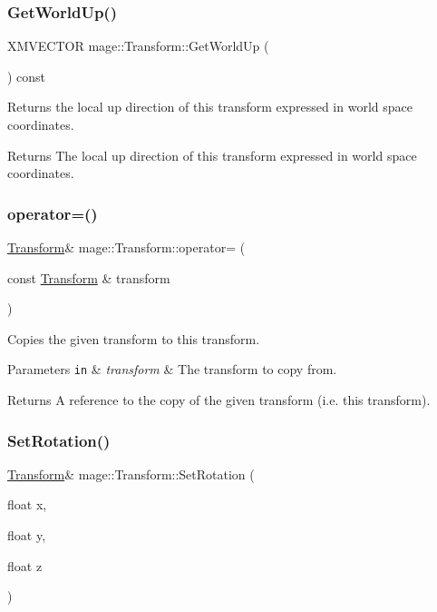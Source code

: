 \subsubsection{\texorpdfstring{Get\+World\+Up()}{GetWorldUp()}}
{\footnotesize\ttfamily X\+M\+V\+E\+C\+T\+OR mage\+::\+Transform\+::\+Get\+World\+Up (\begin{DoxyParamCaption}{ }\end{DoxyParamCaption}) const}

Returns the local up direction of this transform expressed in world space coordinates.

\begin{DoxyReturn}{Returns}
The local up direction of this transform expressed in world space coordinates. 
\end{DoxyReturn}
\hypertarget{structmage_1_1_transform_a40bc8c32b09dc419d0573fffcd938644}{}\label{structmage_1_1_transform_a40bc8c32b09dc419d0573fffcd938644} 
\subsubsection{\texorpdfstring{operator=()}{operator=()}}
{\footnotesize\ttfamily \hyperlink{structmage_1_1_transform}{Transform}\& mage\+::\+Transform\+::operator= (\begin{DoxyParamCaption}\item[{const \hyperlink{structmage_1_1_transform}{Transform} \&}]{transform }\end{DoxyParamCaption})}

Copies the given transform to this transform.


\begin{DoxyParams}[1]{Parameters}
\mbox{\tt in}  & {\em transform} & The transform to copy from. \\
\hline
\end{DoxyParams}
\begin{DoxyReturn}{Returns}
A reference to the copy of the given transform (i.\+e. this transform). 
\end{DoxyReturn}
\hypertarget{structmage_1_1_transform_a46e9e3f5eb3b205307722af7b4a3e85e}{}\label{structmage_1_1_transform_a46e9e3f5eb3b205307722af7b4a3e85e} 
\subsubsection{\texorpdfstring{Set\+Rotation()}{SetRotation()}\hspace{0.1cm}{\footnotesize\ttfamily [1/2]}}
{\footnotesize\ttfamily \hyperlink{structmage_1_1_transform}{Transform}\& mage\+::\+Transform\+::\+Set\+Rotation (\begin{DoxyParamCaption}\item[{float}]{x,  }\item[{float}]{y,  }\item[{float}]{z }\end{DoxyParamCaption})}

